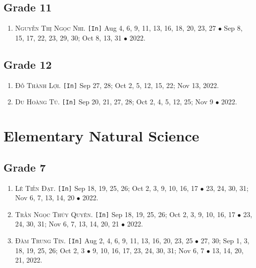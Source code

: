 \documentclass{article}
\numberwithin{equation}{section}
\begin{document}
\subsection{Grade 11}
\begin{enumerate}
	\item \textsc{Nguyễn Thị Ngọc Nhi.} \texttt{[In]} Aug 4, 6, 9, 11, 13, 16, 18, 20, 23, 27 $\bullet$ Sep 8, 15, 17, 22, 23, 29, 30; Oct 8, 13, 31 $\bullet$ 2022.
\end{enumerate}

\subsection{Grade 12}
\begin{enumerate}
	\item \textsc{Đỗ Thành Lợi.} \texttt{[In]} Sep 27, 28; Oct 2, 5, 12, 15, 22; Nov 13, 2022.
	\item \textsc{Du Hoàng Tú.} \texttt{[In]} Sep 20, 21, 27, 28; Oct 2, 4, 5, 12, 25; Nov 9 $\bullet$ 2022.
\end{enumerate}


\section{Elementary Natural Science}

\subsection{Grade 7}
\begin{enumerate}
	\item \textsc{Lê Tiến Đạt.} \texttt{[In]} Sep 18, 19, 25, 26; Oct 2, 3, 9, 10, 16, 17 $\bullet$ 23, 24, 30, 31; Nov 6, 7, 13, 14, 20 $\bullet$ 2022.
	\item \textsc{Trần Ngọc Thúy Quyên.} \texttt{[In]} Sep 18, 19, 25, 26; Oct 2, 3, 9, 10, 16, 17 $\bullet$ 23, 24, 30, 31; Nov 6, 7, 13, 14, 20, 21 $\bullet$ 2022.
	\item \textsc{Đàm Trung Tín.} \texttt{[In]} Aug 2, 4, 6, 9, 11, 13, 16, 20, 23, 25 $\bullet$ 27, 30; Sep 1, 3, 18, 19, 25, 26; Oct 2, 3 $\bullet$ 9, 10, 16, 17, 23, 24, 30, 31; Nov 6, 7 $\bullet$ 13, 14, 20, 21, 2022.
\end{enumerate}

\end{document}

